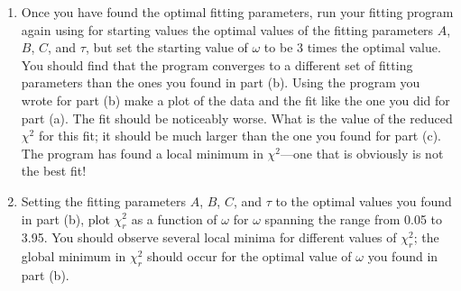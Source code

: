 \documentclass[letterpaper,10pt,english]{sphinxmanual}
\begin{document}
\begin{enumerate}
\begin{enumerate}
\item {} 
\sphinxAtStartPar
Once you have found the optimal fitting parameters, run your fitting program again using for starting values the optimal values of the fitting parameters \(A\), \(B\), \(C\), and \(\tau\), but set the starting value of \(\omega\) to be 3 times the optimal value.  You should find that the program converges to a different set of fitting parameters than the ones you found in part (b).  Using the program you wrote for part (b) make a plot of the data and the fit like the one you did for part (a).  The fit should be noticeably worse.  What is the value of the reduced \(\chi^2\) for this fit; it should be much larger than the one you found for part (c).  The program  has found a local minimum in \(\chi^2\)—one that is obviously is not the best fit!

\item {} 
\sphinxAtStartPar
Setting the fitting parameters \(A\), \(B\), \(C\), and \(\tau\) to the optimal values you found in part (b), plot \(\chi_r^2\) as a function of \(\omega\) for \(\omega\) spanning the range from 0.05 to 3.95.  You should observe several local minima for different values of \(\chi_r^2\); the global minimum in \(\chi_r^2\) should occur for the optimal value of \(\omega\) you found in part (b).


\end{enumerate}
\end{enumerate}
\end{document}
